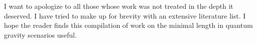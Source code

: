 \documentclass{article}
\begin{document}
I want to apologize to all those whose work was not treated in the depth it deserved. I have tried to make up for brevity with
an extensive literature list. I hope the reader finds this compilation of work on the minimal length in quantum gravity 
scenarios useful.


\clearpage
{}
{}
\printindex


\newpage


\end{document}
